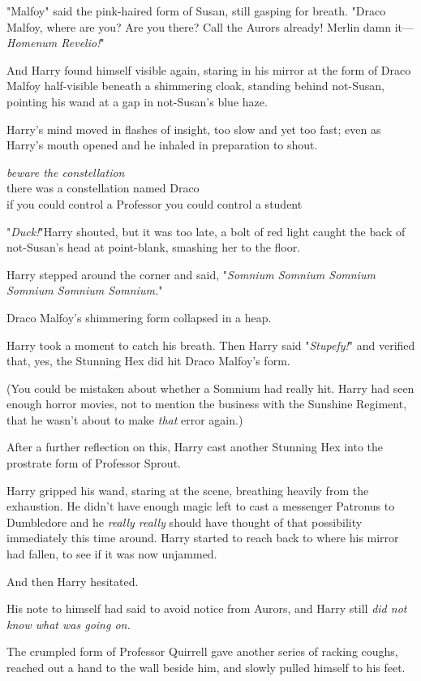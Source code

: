 "Malfoy{\el}" said the pink-haired form of Susan, still gasping for breath.
"Draco Malfoy, where are you? Are you there? Call the Aurors already! Merlin
damn it—\emph{Homenum Revelio!}"

And Harry found himself visible again, staring in his mirror at the form of
Draco Malfoy half-visible beneath a shimmering cloak, standing behind
not-Susan, pointing his wand at a gap in not-Susan's blue haze.

Harry's mind moved in flashes of insight, too slow and yet too fast; even as
Harry's mouth opened and he inhaled in preparation to shout.

\noindent{}\emph{beware the constellation}\\
there was a constellation named Draco\\
if you could control a Professor you could control a student

"\emph{Duck!}"Harry shouted, but it was too late, a bolt of red light caught
the back of not-Susan's head at point-blank, smashing her to the floor.

Harry stepped around the corner and said, "\emph{Somnium Somnium Somnium
Somnium Somnium Somnium.}"

Draco Malfoy's shimmering form collapsed in a heap.

Harry took a moment to catch his breath. Then Harry said "\emph{Stupefy!}" and
verified that, yes, the Stunning Hex did hit Draco Malfoy's form.

(You could be mistaken about whether a Somnium had really hit. Harry had seen
enough horror movies, not to mention the business with the Sunshine Regiment,
that he wasn't about to make \emph{that} error again.)

After a further reflection on this, Harry cast another Stunning Hex into the
prostrate form of Professor Sprout.

Harry gripped his wand, staring at the scene, breathing heavily from the
exhaustion. He didn't have enough magic left to cast a messenger Patronus to
Dumbledore and he \emph{really really} should have thought of that possibility
immediately this time around. Harry started to reach back to where his mirror
had fallen, to see if it was now unjammed.

And then Harry hesitated.

His note to himself had said to avoid notice from Aurors, and Harry still
\emph{did not know what was going on.}

The crumpled form of Professor Quirrell gave another series of racking coughs,
reached out a hand to the wall beside him, and slowly pulled himself to his
feet.

